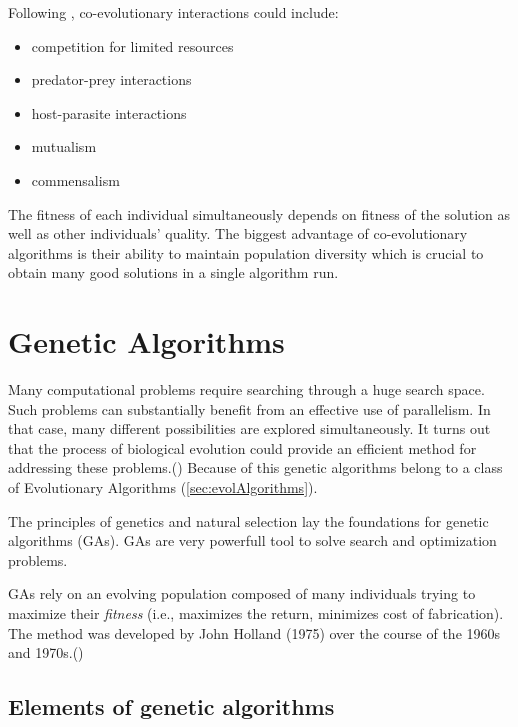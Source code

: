 Following \cite{Dre}, co-evolutionary interactions could include:

\begin{itemize}
  \item competition for limited resources
  \item predator-prey interactions
  \item host-parasite interactions
  \item mutualism
  \item commensalism
\end{itemize}

The fitness of each individual simultaneously depends on fitness of the solution as well as other individuals' quality.
The biggest advantage of co-evolutionary algorithms is their ability to maintain population diversity which is crucial to obtain many good solutions in a single algorithm run.    

  


\section{Genetic Algorithms}
\label{sec:genAlgorithms}

Many computational problems require searching through a huge search space.
Such problems can substantially benefit from an effective use of parallelism.
In that case, many different possibilities are explored simultaneously. 
It turns out that the process of biological evolution could provide an efficient method for addressing these problems.(\cite{Mitchell01})
Because of this genetic algorithms belong to a class of Evolutionary Algorithms (\ref{sec:evolAlgorithms}).


The principles of genetics and natural selection lay the foundations for genetic algorithms (GAs).
GAs are very powerfull tool to solve search and optimization problems.

GAs rely on an evolving population composed of many individuals trying to maximize their \emph{fitness} (i.e., maximizes the return, minimizes cost of fabrication).  
The method was developed by John Holland (1975) over the course of the 1960s and 1970s.(\cite{Haupt:2004:PGA:1007746})

\subsection{Elements of genetic algorithms}

